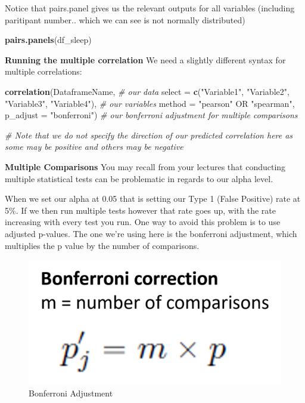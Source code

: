 \documentclass[
]{book}
\newenvironment{Shaded}{\begin{snugshade}}{\end{snugshade}}
\newcommand{\AttributeTok}[1]{\textcolor[rgb]{0.13,0.29,0.53}{#1}}
\newcommand{\CommentTok}[1]{\textcolor[rgb]{0.56,0.35,0.01}{\textit{#1}}}
\newcommand{\FunctionTok}[1]{\textcolor[rgb]{0.13,0.29,0.53}{\textbf{#1}}}
\newcommand{\NormalTok}[1]{#1}
\newcommand{\StringTok}[1]{\textcolor[rgb]{0.31,0.60,0.02}{#1}}
\begin{document}
Notice that pairs.panel gives us the relevant outputs for all variables (including paritipant number.. which we can see is not normally distributed)

\begin{Shaded}
\begin{Highlighting}[]
\FunctionTok{pairs.panels}\NormalTok{(df\_sleep)}
\end{Highlighting}
\end{Shaded}

\textbf{Running the multiple correlation} We need a slightly different syntax for multiple correlations:

\begin{Shaded}
\begin{Highlighting}[]
\FunctionTok{correlation}\NormalTok{(DataframeName, }\CommentTok{\# our data}
            \AttributeTok{select =} \FunctionTok{c}\NormalTok{(}\StringTok{"Variable1"}\NormalTok{, }\StringTok{"Variable2"}\NormalTok{, }\StringTok{"Variable3"}\NormalTok{, }\StringTok{"Variable4"}\NormalTok{), }\CommentTok{\# our variables}
             \AttributeTok{method =} \StringTok{"pearson"}\NormalTok{ OR }\StringTok{"spearman"}\NormalTok{,}
            \AttributeTok{p\_adjust =} \StringTok{"bonferroni"}\NormalTok{) }\CommentTok{\# our bonferroni adjustment for multiple comparisons}

\CommentTok{\# Note that we do not specify the direction of our predicted correlation here as some may be positive and others may be negative}
\end{Highlighting}
\end{Shaded}

\textbf{Multiple Comparisons} You may recall from your lectures that conducting multiple statistical tests can be problematic in regards to our alpha level.

When we set our alpha at 0.05 that is setting our Type 1 (False Positive) rate at 5\%. If we then run multiple tests however that rate goes up, with the rate increasing with every test you run. One way to avoid this problem is to use adjusted p-values. The one we're using here is the bonferroni adjustment, which multiplies the p value by the number of comparisons.

\begin{figure}
\centering
\includegraphics{img/Bonferroni.png}
\caption{Bonferroni Adjustment}
\end{figure}
\end{document}
